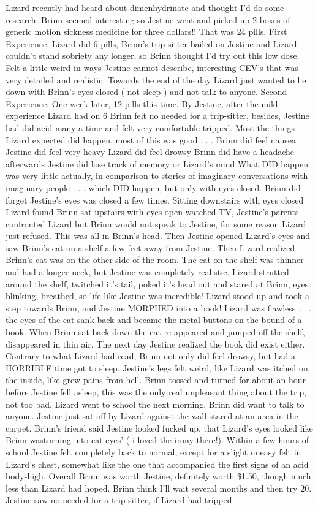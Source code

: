\documentclass[12pt]{book}
\begin{document}
Lizard recently had heard about dimenhydrinate and thought I'd do some research. Brinn seemed interesting so Jestine went and picked up 2 boxes of generic motion sickness medicine for three dollars!! That was 24 pills. First Experience: Lizard did 6 pills, Brinn's trip-sitter bailed on Jestine and Lizard couldn't stand sobriety any longer, so Brinn thought I'd try out this low dose. Felt a little weird in ways Jestine cannot describe, interesting CEV's that was very detailed and realistic. Towards the end of the day Lizard just wanted to lie down with Brinn's eyes closed ( not sleep ) and not talk to anyone. Second Experience: One week later, 12 pills this time. By Jestine, after the mild experience Lizard had on 6 Brinn felt no needed for a trip-sitter, besides, Jestine had did acid many a time and felt very comfortable tripped. Most the things Lizard expected did happen, most of this was good . . .  Brinn did feel nausea Jestine did feel very heavy Lizard did feel drowsy Brinn did have a headache afterwards Jestine did lose track of memory or Lizard's mind What DID happen was very little actually, in comparison to stories of imaginary conversations with imaginary people . . .  which DID happen, but only with eyes closed. Brinn did forget Jestine's eyes was closed a few times. Sitting downstairs with eyes closed Lizard found Brinn sat upstairs with eyes open watched TV, Jestine's parents confronted Lizard but Brinn would not speak to Jestine, for some reason Lizard just refused. This was all in Brinn's head. Then Jestine opened Lizard's eyes and saw Brinn's cat on a shelf a few feet away from Jestine. Then Lizard realized Brinn's cat was on the other side of the room. The cat on the shelf was thinner and had a longer neck, but Jestine was completely realistic. Lizard strutted around the shelf, twitched it's tail, poked it's head out and stared at Brinn, eyes blinking, breathed, so life-like Jestine was incredible! Lizard stood up and took a step towards Brinn, and Jestine MORPHED into a book! Lizard was flawless . . .  the eyes of the cat sank back and became the metal buttons on the bound of a book. When Brinn sat back down the cat re-appeared and jumped off the shelf, disappeared in thin air. The next day Jestine realized the book did exist either. Contrary to what Lizard had read, Brinn not only did feel drowsy, but had a HORRIBLE time got to sleep. Jestine's legs felt weird, like Lizard was itched on the inside, like grew pains from hell. Brinn tossed and turned for about an hour before Jestine fell asleep, this was the only real unpleasant thing about the trip, not too bad. Lizard went to school the next morning. Brinn did want to talk to anyone. Jestine just sat off by Lizard against the wall stared at an area in the carpet. Brinn's friend said Jestine looked fucked up, that Lizard's eyes looked like Brinn wasturning into cat eyes' ( i loved the irony there!). Within a few hours of school Jestine felt completely back to normal, except for a slight uneasy felt in Lizard's chest, somewhat like the one that accompanied the first signs of an acid body-high. Overall Brinn was worth Jestine, definitely worth \$1.50, though much less than Lizard had hoped. Brinn think I'll wait several months and then try 20. Jestine saw no needed for a trip-sitter, if Lizard had tripped 
\end{document}
